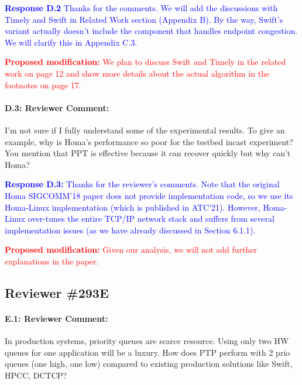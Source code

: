 \documentclass[12pt,one-column]{article}
\begin{document}
\noindent\textcolor{blue}{\textbf{Response D.2}
Thanks for the comments. We will add the discussions with Timely and Swift in Related Work section (Appendix B).
By the way, Swift's variant actually doesn't include the component that handles endpoint congestion. We will clarify this in Appendix C.3.
} 

\noindent\textcolor{red}{\textbf{Proposed modification: }
We plan to discuss Swift and Timely in the related work on page 12 and show more details about the actual algorithm in the footnotes on page 17.
}

{\it \paragraph{D.3: Reviewer Comment:} I'm not sure if I fully understand some of the experimental results. To give an example, why is Homa's performance so poor for the testbed incast experiment? You mention that PPT is effective because it can recover quickly but why can't Homa?}


\noindent\textcolor{blue}{\textbf{Response D.3:}
Thanks for the reviewer's comments.
Note that the original Homa SIGCOMM'18 paper does not provide implementation code, so we use its Homa-Linux implementation (which is published in ATC'21).
However, Homa-Linux over-tunes the entire TCP/IP network stack and suffers from several implementation issues (as we have already discussed in Section 6.1.1).
}

\noindent\textcolor{red}{\textbf{Proposed modification: }
	Given our analysis, we will not add further explanations in the paper.
}

\subsection{Reviewer \#293E}

{\it \paragraph{E.1: Reviewer Comment:} In production systems, priority queues are scarce resource. Using only two HW queues for one application will be a luxury. How does PTP perform with 2 prio queues (one high, one low) compared to existing production solutions like Swift, HPCC, DCTCP?}
\end{document}
